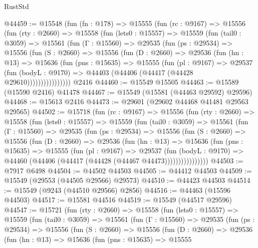 \begin{lexlean}{RustStd}
\begin{coremodule}
@44459 := @15548
    (fun (fn : @178) =>
    @15555
      (fun (rc : @9167) =>
      @15556
        (fun (rty : @2660) =>
        @15558
          (fun (lets0 : @15557) =>
          @15559
            (fun (tail0 : @3059) =>
            @15561
              (fun (Γ : @15560) =>
              @29535
                (fun (ps : @29534) =>
                @15556
                  (fun (S : @2660) =>
                  @15556
                    (fun (D : @2660) =>
                    @29536
                      (fun (hn : @13) =>
                      @15636
                        (fun (pns : @15635) =>
                        @15555
                          (fun (pl : @9167) =>
                          @29537
                            (fun (bodyL : @9170) =>
                            @44403 (@44406 (@44417 (@44428 @29610))))))))))))))))
    @2416
@44460 := @15549 @15505
@44463 := @15589 (@15590 @2416) @41478
@44467 := @15549 (@15581 (@44463 @29592) @29596)
@44468 := @15613 @2416
@44473 := @29601 (@29602 @44468 @41481 @29563 @29565)
@44502 := @15718
    (fun (rc : @9167) =>
    @15556
      (fun (rty : @2660) =>
      @15558
        (fun (lets0 : @15557) =>
        @15559
          (fun (tail0 : @3059) =>
          @15561
            (fun (Γ : @15560) =>
            @29535
              (fun (ps : @29534) =>
              @15556
                (fun (S : @2660) =>
                @15556
                  (fun (D : @2660) =>
                  @29536
                    (fun (hn : @13) =>
                    @15636
                      (fun (pns : @15635) =>
                      @15555
                        (fun (pl : @9167) =>
                        @29537
                          (fun (bodyL : @9170) =>
                          @44460 (@44406 (@44417 (@44428 (@44467 @44473))))))))))))))))
@44503 := @7917 @6498
@44504 := @44502 @44503
@44505 := @44412 @44503
@44509 := @15549 (@29553 (@44505 @29566) @29573)
@44510 := @44423 @44503
@44514 := @15549 (@9243 (@44510 @29566) @2856)
@44516 := @44463 (@15596 @44503)
@44517 := @15581 @44516
@44519 := @15549 (@44517 @29596)
@44547 := @15721
    (fun (rty : @2660) =>
    @15558
      (fun (lets0 : @15557) =>
      @15559
        (fun (tail0 : @3059) =>
        @15561
          (fun (Γ : @15560) =>
          @29535
            (fun (ps : @29534) =>
            @15556
              (fun (S : @2660) =>
              @15556
                (fun (D : @2660) =>
                @29536
                  (fun (hn : @13) =>
                  @15636
                    (fun (pns : @15635) =>
                    @15555

\end{coremodule}
\end{lexlean}
